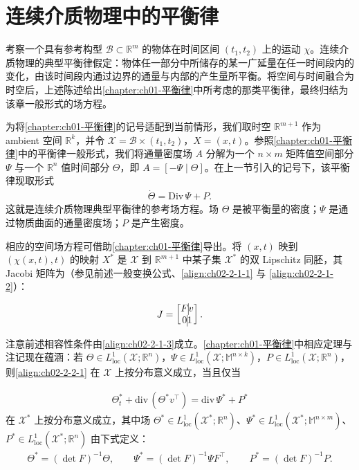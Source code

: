 ﻿\documentclass[../../main.tex]{subfiles}
\begin{document}
\section{连续介质物理中的平衡律}\label{section:ch02-平衡律}

考察一个具有参考构型 $\mathscr{B}\subset\mathbb{R}^{m}$ 的物体在时间区间 $(t_{1},t_{2})$ 上的运动 $\chi$。连续介质物理的典型平衡律假定：物体任一部分中所储存的某一广延量在任一时间段内的变化，由该时间段内通过边界的通量与内部的产生量所平衡。将空间与时间融合为时空后，上述陈述给出\cref{chapter:ch01-平衡律}中所考虑的那类平衡律，最终归结为该章一般形式的场方程。


为将\cref{chapter:ch01-平衡律}的记号适配到当前情形，我们取时空 $\mathbb{R}^{m+1}$ 作为 ambient 空间 $\mathbb{R}^{k}$，并令 $\mathscr{X}=\mathscr{B}\times(t_{1},t_{2})$，$X=(x,t)$。参照\cref{chapter:ch01-平衡律}中的平衡律一般形式，我们将通量密度场 $A$ 分解为一个 $n\times m$ 矩阵值空间部分 $\Psi$ 与一个 $\mathbb{R}^{n}$ 值时间部分 $\Theta$，即 $A=[-\Psi\mid\Theta]$。在上一节引入的记号下，该平衡律现取形式
\begin{align}
\dot{\Theta}=\mathrm{Div}\,\Psi+P.
\label{align:ch02-2-2-1}
\end{align}
这就是连续介质物理典型平衡律的参考场方程。场 $\Theta$ 是被平衡量的密度；$\Psi$ 是通过物质曲面的通量密度场；$P$ 是产生密度。


相应的空间场方程可借助\cref{chapter:ch01-平衡律}导出。将 $(x,t)$ 映到 $(\chi(x,t),t)$ 的映射 $X^{*}$ 是 $\mathscr{X}$ 到 $\mathbb{R}^{m+1}$ 中某子集 $\mathscr{X}^{*}$ 的双 Lipschitz 同胚，其 Jacobi 矩阵为（参见前述一般变换公式、\eqref{align:ch02-2-1-1} 与 \eqref{align:ch02-2-1-2}）：

\begin{align}
J=\begin{bmatrix}F\vline v\\ 0\vline 1\end{bmatrix}.
\label{align:ch02-2-2-2}
\end{align}

注意前述相容性条件由\eqref{align:ch02-2-1-3}成立。\cref{chapter:ch01-平衡律}中相应定理与注记现在蕴涵：若 $\Theta\in L^{1}_{\mathrm{loc}}(\mathscr{X};\mathbb{R}^{n})$，$\Psi\in L^{1}_{\mathrm{loc}}(\mathscr{X};\mathbb{M}^{n\times k})$，$P\in L^{1}_{\mathrm{loc}}(\mathscr{X};\mathbb{R}^{n})$，则\eqref{align:ch02-2-2-1} 在 $\mathscr{X}$ 上按分布意义成立，当且仅当

\begin{align}
\Theta^{*}_{t}+\mathrm{div}\,(\Theta^{*}v^{\top})=\mathrm{div}\,\Psi^{*}+P^{*}
\label{align:ch02-2-2-3}
\end{align}
在 $\mathscr{X}^{*}$ 上按分布意义成立，其中场 $\Theta^{*}\in L^{1}_{\mathrm{loc}}(\mathscr{X}^{*};\mathbb{R}^{n})$、$\Psi^{*}\in L^{1}_{\mathrm{loc}}(\mathscr{X}^{*};\mathbb{M}^{n\times m})$、$P^{*}\in L^{1}_{\mathrm{loc}}(\mathscr{X}^{*};\mathbb{R}^{n})$ 由下式定义：
\begin{align}
\Theta^{*}=(\det F)^{-1}\Theta,\qquad\Psi^{*}=(\det F)^{-1}\Psi F^{\top},\qquad P^{*}=(\det F)^{-1}P.
\label{align:ch02-2-2-4}
\end{align}
\end{document}
